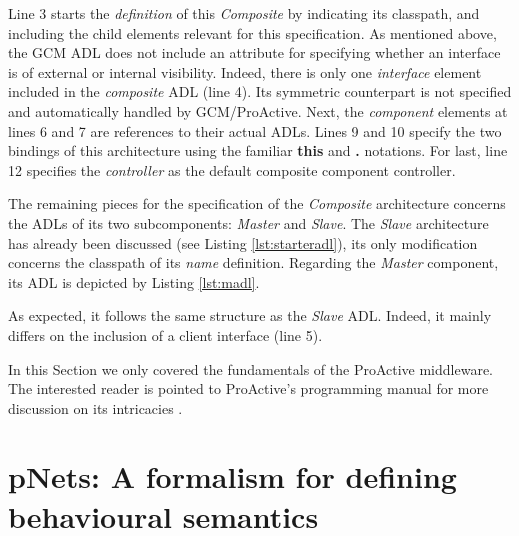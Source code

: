 	
		

 
	\noindent Line 3 starts the \textit{definition} of this \textit{Composite} by indicating its classpath, and
	including the child elements relevant for this specification.	
	As mentioned above, the \ac{GCM} \ac{ADL} does not include an attribute for specifying whether an interface
	is of external or internal visibility. Indeed, there is only one \textit{interface} element included in the 
	\textit{composite} \ac{ADL} (line 4). Its symmetric counterpart is not specified and automatically handled by GCM/ProActive.
	Next, the \textit{component} elements at lines 6 and 7 are references to their actual \ac{ADL}s.
	Lines 9 and 10 specify the two bindings of this architecture using	the familiar \textbf{this} 
	and \textbf{.} notations. For last, line 12 specifies the \textit{controller} 
	as the default composite component controller.
	
	
	The remaining pieces for the specification of the \textit{Composite} architecture concerns
	the \ac{ADL}s of its two subcomponents: \textit{Master} and \textit{Slave}.
	The \textit{Slave} architecture has already been discussed (see Listing \ref{lst:starteradl}),
	its only modification concerns the classpath of its \textit{name} definition.
	Regarding the \textit{Master} component, its \ac{ADL} is depicted by Listing \ref{lst:madl}.
	
	
			

		
	\noindent As expected, it follows the same structure as the \textit{Slave} \ac{ADL}. Indeed,
	it mainly differs on the inclusion of a client interface (line 5).
	
	
		
	In this Section we only covered the fundamentals of the ProActive	middleware.	
	The interested reader is pointed to ProActive's programming manual for more
	discussion on its intricacies \cite{PROACTIVE2013:GCM}.		
		

\section{pNets: A formalism for defining behavioural semantics}
\label{sec:pnets}

